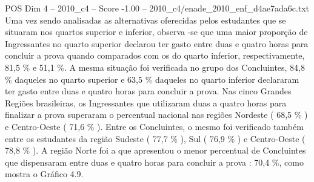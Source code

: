 \begin{textsample}{POS Dim 4 – 2010\_c4 – Score -1.00 – 2010\_c4/enade\_2010\_enf\_d4ae7ada6c.txt}
Uma vez sendo analisadas as alternativas oferecidas pelos estudantes que se situaram nos quartos superior e inferior, observa -se que uma maior proporção de Ingressantes no quarto superior declarou ter gasto entre duas e quatro horas para concluir a prova quando comparados com os do quarto inferior, respectivamente, 81,5 \% e 51,1 \%.
A mesma situação foi verificada no grupo dos Concluintes, 84,8 \% daqueles no quarto superior e 63,5 \% daqueles no quarto inferior declararam ter gasto entre duas e quatro horas para concluir a prova.
Nas cinco Grandes Regiões brasileiras, os Ingressantes que utilizaram duas a quatro horas para finalizar a prova superaram o percentual nacional nas regiões Nordeste ( 68,5 \% ) e Centro-Oeste ( 71,6 \% ).
Entre os Concluintes, o mesmo foi verificado também entre os estudantes da região Sudeste ( 77,7 \% ), Sul ( 76,9 \% ) e Centro-Oeste ( 78,8 \% ).
A região Norte foi a que apresentou o menor percentual de Concluintes que dispensaram entre duas e quatro horas para concluir a prova : 70,4 \%, como mostra o Gráfico 4.9.

\end{textsample}
